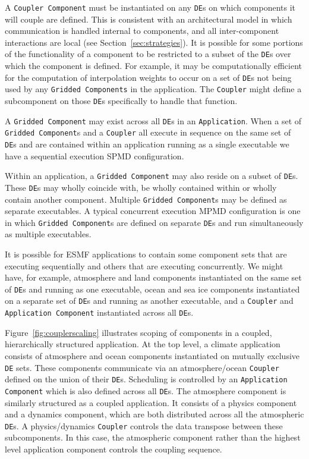 A {\tt Coupler Component} must be instantiated on any {\tt DE}s on which components
it will couple are defined.  This is consistent with an architectural
model in which communication is handled internal to components, and all
inter-component interactions are local (see Section~\ref{sec:strategies}).  
It is possible for
some portions of the functionality of a component to be restricted to
a subset of the {\tt DE}s over which the component is defined.  For example, 
it may be computationally efficient for the computation of interpolation
weights to occur on a set of {\tt DE}s not being used by any {\tt Gridded 
Components}
in the application.  The {\tt Coupler} might define a subcomponent on 
those {\tt DE}s specifically to handle that function.

A {\tt Gridded Component} may exist across all {\tt DE}s in an {\tt Application}.  
When a set of {\tt Gridded  Component}s and a {\tt Coupler} all execute in sequence on 
the same set of {\tt DE}s and are contained within an application running 
as a single executable we have a sequential execution SPMD configuration.  

Within an application, a {\tt Gridded Component} may also reside on 
a subset of {\tt DE}s.  These {\tt DE}s may wholly coincide with, be wholly 
contained within or wholly contain another component.  Multiple {\tt Gridded 
Component}s may be defined as separate executables.  A typical 
concurrent execution MPMD configuration is one in which {\tt Gridded Component}s 
are defined on separate {\tt DE}s and run simultaneously as multiple 
executables.  

It is possible for ESMF applications to contain some component sets
that are executing sequentially and others that are executing concurrently.
We might have, for example, atmosphere and land components instantiated 
on the same set of 
{\tt DE}s and running as one executable, ocean and sea ice 
components instantiated on a separate set of {\tt DE}s and running as 
another executable, and a {\tt Coupler} and {\tt Application Component} 
instantiated across all {\tt DE}s.

Figure~\ref{fig:couplerscaling} illustrates scoping of components
in a coupled, hierarchically structured application.  At the top level, 
a climate application consists of atmosphere and ocean components 
instantiated on mutually exclusive {\tt DE} sets.  These components communicate 
via an atmosphere/ocean {\tt Coupler} defined on the union of their {\tt DE}s.  
Scheduling is controlled by an {\tt Application
Component} which is also defined across all {\tt DE}s.  The atmosphere component
is similarly structured as a coupled application.  It consists of a 
physics component and a dynamics component, which are both distributed
across all the atmospheric {\tt DE}s.  A physics/dynamics {\tt Coupler} controls
the data transpose between these subcomponents.  In this case, the
atmospheric component rather than the highest level application component
controls the coupling sequence.  

